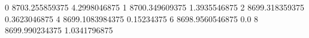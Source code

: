 0 8703.255859375 4.2998046875
1 8700.349609375 1.3935546875
2 8699.318359375 0.3623046875
4 8699.1083984375 0.15234375
6 8698.9560546875 0.0
8 8699.990234375 1.0341796875
